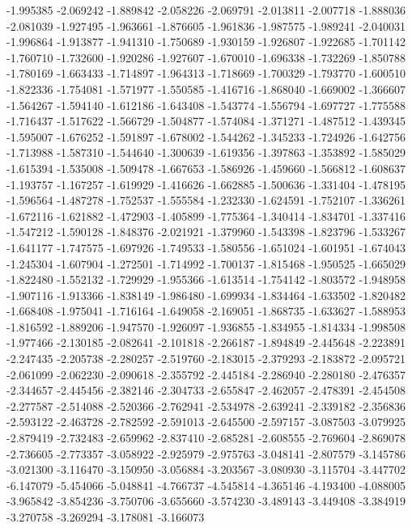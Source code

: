 -1.995385
-2.069242
-1.889842
-2.058226
-2.069791
-2.013811
-2.007718
-1.888036
-2.081039
-1.927495
-1.963661
-1.876605
-1.961836
-1.987575
-1.989241
-2.040031
-1.996864
-1.913877
-1.941310
-1.750689
-1.930159
-1.926807
-1.922685
-1.701142
-1.760710
-1.732600
-1.920286
-1.927607
-1.670010
-1.696338
-1.732269
-1.850788
-1.780169
-1.663433
-1.714897
-1.964313
-1.718669
-1.700329
-1.793770
-1.600510
-1.822336
-1.754081
-1.571977
-1.550585
-1.416716
-1.868040
-1.669002
-1.366607
-1.564267
-1.594140
-1.612186
-1.643408
-1.543774
-1.556794
-1.697727
-1.775588
-1.716437
-1.517622
-1.566729
-1.504877
-1.574084
-1.371271
-1.487512
-1.439345
-1.595007
-1.676252
-1.591897
-1.678002
-1.544262
-1.345233
-1.724926
-1.642756
-1.713988
-1.587310
-1.544640
-1.300639
-1.619356
-1.397863
-1.353892
-1.585029
-1.615394
-1.535008
-1.509478
-1.667653
-1.586926
-1.459660
-1.566812
-1.608637
-1.193757
-1.167257
-1.619929
-1.416626
-1.662885
-1.500636
-1.331404
-1.478195
-1.596564
-1.487278
-1.752537
-1.555584
-1.232330
-1.624591
-1.752107
-1.336261
-1.672116
-1.621882
-1.472903
-1.405899
-1.775364
-1.340414
-1.834701
-1.337416
-1.547212
-1.590128
-1.848376
-2.021921
-1.379960
-1.543398
-1.823796
-1.533267
-1.641177
-1.747575
-1.697926
-1.749533
-1.580556
-1.651024
-1.601951
-1.674043
-1.245304
-1.607904
-1.272501
-1.714992
-1.700137
-1.815468
-1.950525
-1.665029
-1.822480
-1.552132
-1.729929
-1.955366
-1.613514
-1.754142
-1.803572
-1.948958
-1.907116
-1.913366
-1.838149
-1.986480
-1.699934
-1.834464
-1.633502
-1.820482
-1.668408
-1.975041
-1.716164
-1.649058
-2.169051
-1.868735
-1.633627
-1.588953
-1.816592
-1.889206
-1.947570
-1.926097
-1.936855
-1.834955
-1.814334
-1.998508
-1.977466
-2.130185
-2.082641
-2.101818
-2.266187
-1.894849
-2.445648
-2.223891
-2.247435
-2.205738
-2.280257
-2.519760
-2.183015
-2.379293
-2.183872
-2.095721
-2.061099
-2.062230
-2.090618
-2.355792
-2.445184
-2.286940
-2.280180
-2.476357
-2.344657
-2.445456
-2.382146
-2.304733
-2.655847
-2.462057
-2.478391
-2.454508
-2.277587
-2.514088
-2.520366
-2.762941
-2.534978
-2.639241
-2.339182
-2.356836
-2.593122
-2.463728
-2.782592
-2.591013
-2.645500
-2.597157
-3.087503
-3.079925
-2.879419
-2.732483
-2.659962
-2.837410
-2.685281
-2.608555
-2.769604
-2.869078
-2.736605
-2.773357
-3.058922
-2.925979
-2.975763
-3.048141
-2.807579
-3.145786
-3.021300
-3.116470
-3.150950
-3.056884
-3.203567
-3.080930
-3.115704
-3.447702
-6.147079
-5.454066
-5.048841
-4.766737
-4.545814
-4.365146
-4.193400
-4.088005
-3.965842
-3.854236
-3.750706
-3.655660
-3.574230
-3.489143
-3.449408
-3.384919
-3.270758
-3.269294
-3.178081
-3.166073
